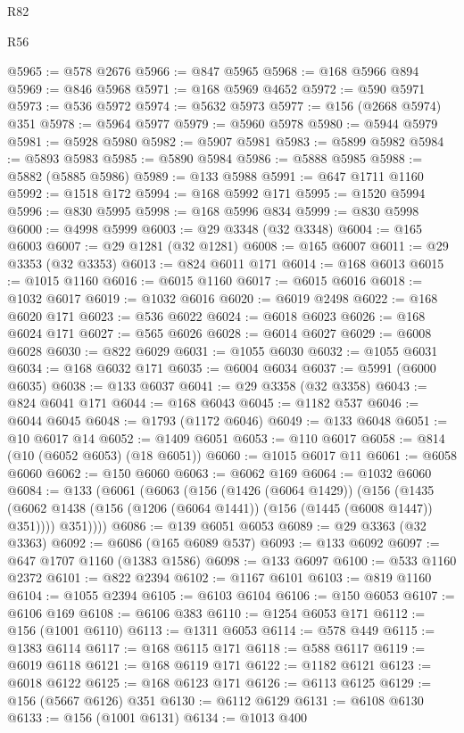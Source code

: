 \begin{lexlean}{R82}
\begin{lexlean}{R56}
\begin{coremodule}
{{{{{{{{{{{{{{{{{{{{{{{{{{{{{{{{{{{{{{{{{{{{{{{{{{{{{{{{{{{{{{{{{{{{{{{{{{{{{{{{{{{{{{{{{{{{{{{{{{{{{{{{{{{{{{{{{{{{{{{{{{{{{{{{{{{{{{{{{{{{{{{{{{{{{{{{{{{{{{{{{{{{{{{{{{{{{{{{{{{{{{{{{{{{{{{{{{{{{{{{{{{{{{{{{{{@5965 := @578 @2676
@5966 := @847 @5965
@5968 := @168 @5966 @894
@5969 := @846 @5968
@5971 := @168 @5969 @4652
@5972 := @590 @5971
@5973 := @536 @5972
@5974 := @5632 @5973
@5977 := @156 (@2668 @5974) @351
@5978 := @5964 @5977
@5979 := @5960 @5978
@5980 := @5944 @5979
@5981 := @5928 @5980
@5982 := @5907 @5981
@5983 := @5899 @5982
@5984 := @5893 @5983
@5985 := @5890 @5984
@5986 := @5888 @5985
@5988 := @5882 (@5885 @5986)
@5989 := @133 @5988
@5991 := @647 @1711 @1160
@5992 := @1518 @172
@5994 := @168 @5992 @171
@5995 := @1520 @5994
@5996 := @830 @5995
@5998 := @168 @5996 @834
@5999 := @830 @5998
@6000 := @4998 @5999
@6003 := @29 @3348 (@32 @3348)
@6004 := @165 @6003
@6007 := @29 @1281 (@32 @1281)
@6008 := @165 @6007
@6011 := @29 @3353 (@32 @3353)
@6013 := @824 @6011 @171
@6014 := @168 @6013
@6015 := @1015 @1160
@6016 := @6015 @1160
@6017 := @6015 @6016
@6018 := @1032 @6017
@6019 := @1032 @6016
@6020 := @6019 @2498
@6022 := @168 @6020 @171
@6023 := @536 @6022
@6024 := @6018 @6023
@6026 := @168 @6024 @171
@6027 := @565 @6026
@6028 := @6014 @6027
@6029 := @6008 @6028
@6030 := @822 @6029
@6031 := @1055 @6030
@6032 := @1055 @6031
@6034 := @168 @6032 @171
@6035 := @6004 @6034
@6037 := @5991 (@6000 @6035)
@6038 := @133 @6037
@6041 := @29 @3358 (@32 @3358)
@6043 := @824 @6041 @171
@6044 := @168 @6043
@6045 := @1182 @537
@6046 := @6044 @6045
@6048 := @1793 (@1172 @6046)
@6049 := @133 @6048
@6051 := @10 @6017 @14
@6052 := @1409 @6051
@6053 := @110 @6017
@6058 := @814 (@10 (@6052 @6053) (@18 @6051))
@6060 := @1015 @6017 @11
@6061 := @6058 @6060
@6062 := @150 @6060
@6063 := @6062 @169
@6064 := @1032 @6060
@6084 := @133
    (@6061
      (@6063
        (@156
          (@1426 (@6064 @1429))
          (@156
            (@1435 (@6062 @1438 (@156 (@1206 (@6064 @1441)) (@156 (@1445 (@6008 @1447)) @351))))
            @351))))
@6086 := @139 @6051 @6053
@6089 := @29 @3363 (@32 @3363)
@6092 := @6086 (@165 @6089 @537)
@6093 := @133 @6092
@6097 := @647 @1707 @1160 (@1383 @1586)
@6098 := @133 @6097
@6100 := @533 @1160 @2372
@6101 := @822 @2394
@6102 := @1167 @6101
@6103 := @819 @1160
@6104 := @1055 @2394
@6105 := @6103 @6104
@6106 := @150 @6053
@6107 := @6106 @169
@6108 := @6106 @383
@6110 := @1254 @6053 @171
@6112 := @156 (@1001 @6110)
@6113 := @1311 @6053
@6114 := @578 @449
@6115 := @1383 @6114
@6117 := @168 @6115 @171
@6118 := @588 @6117
@6119 := @6019 @6118
@6121 := @168 @6119 @171
@6122 := @1182 @6121
@6123 := @6018 @6122
@6125 := @168 @6123 @171
@6126 := @6113 @6125
@6129 := @156 (@5667 @6126) @351
@6130 := @6112 @6129
@6131 := @6108 @6130
@6133 := @156 (@1001 @6131)
@6134 := @1013 @400
}}}}}}}}}}}}}}}}}}}}}}}}}}}}}}}}}}}}}}}}}}}}}}}}}}}}}}}}}}}}}}}}}}}}}}}}}}}}}}}}}}}}}}}}}}}}}}}}}}}}}}}}}}}}}}}}}}}}}}}}}}}}}}}}}}}}}}}}}}}}}}}}}}}}}}}}}}}}}}}}}}}}}}}}}}}}}}}}}}}}}}}}}}}}}}}}}}}}}}}}}}}}}}}}}}}
\end{coremodule}
\end{lexlean}
\end{lexlean}
